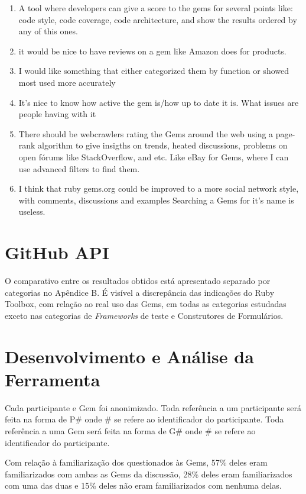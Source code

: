 \begin{enumerate}
	\item A tool where developers can give a score to the gems for several points like: code style, code coverage, code architecture, and show the results ordered by any of this ones.
    \item it would be nice to have reviews on a gem like Amazon does for products.
    \item I would like something that either categorized them by function or showed most used more accurately
    \item It's nice to know how active the gem is/how up to date it is.  What issues are people having with it
    \item There should be webcrawlers rating the Gems around the web using a page-rank algorithm to give insigths on trends, heated discussions, problems on open fórums like StackOverflow, and etc. Like eBay for Gems, where I can use advanced filters to find them.
    \item I think that ruby gems.org could be improved to a more social network style, with comments, discussions and examples
Searching a Gems for it's name is useless.
\end{enumerate}

\section{GitHub API}

O comparativo entre os resultados obtidos está apresentado separado por categorias no Apêndice B. É visível a discrepância das indicações do Ruby Toolbox, com relação ao real uso das Gems, em todas as categorias estudadas exceto nas categorias de \textit{Frameworks} de teste e Construtores de Formulários.

\section{Desenvolvimento e Análise da Ferramenta}

Cada participante e Gem foi anonimizado. Toda referência a um participante será feita na forma de P\# onde \# se refere ao identificador do participante. Toda referência a uma Gem será feita na forma de G\# onde \# se refere ao identificador do participante.

Com relação à familiarização dos questionados às Gems, 57\% deles eram familiarizados com ambas as Gems da discussão, 28\% deles eram familiarizados com uma das duas e 15\% deles não eram familiarizados com nenhuma delas.

